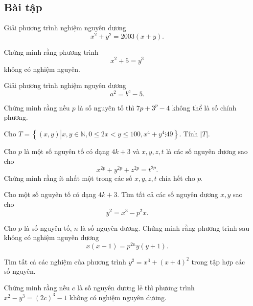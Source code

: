 \subsection{Bài tập}
\setcounter{bt}{0}
\begin{bt}%
	Giải phương trình nghiệm nguyên dương
	$$x^2+y^2=2003(x+y).$$
\end{bt}
\begin{bt}%
	Chứng minh rằng phương trình 
	$$x^2+5=y^3$$
	không có nghiệm nguyên.
\end{bt}
\begin{bt}%
	Giải phương trình nghiệm nguyên dương
	$$a^2=b^c-5.$$
\end{bt}
\begin{bt}%
	Chứng minh rằng nếu $p$ là số nguyên tố thì $7p+3^p-4$ không thể là số chính phương.
\end{bt}
\begin{bt}%
	Cho $T = \left\{ {\left( {x,y} \right)\left| {x,y \in \mathbb{N},0 \le 2x < y \le 100,{x^4} + {y^4} \vdots 49} \right.} \right\}$. Tính $|T|$.
\end{bt}
\begin{bt}%
	Cho $p$ là một số nguyên tố có dạng $4k+3$ và $x,y,z,t$ là các số nguyên dương sao cho $$x^{2p}+y^{2p}+z^{2p}=t^{2p}.$$
	Chứng minh rằng ít nhất một trong các số $x,y,z,t$ chia hết cho $p$.
\end{bt}
\begin{bt}%
	Cho một số nguyên tố có dạng $4k+3$. Tìm tất cả các số nguyên dương $x,y$ sao cho
	$$y^2=x^3-p^2x.$$
\end{bt}
\begin{bt}%
	Cho $p$ là số nguyên tố, $n$ là số nguyên dương. Chứng minh rằng phương trình sau không có nghiệm nguyên dương
	$$x(x+1)=p^{2n}y(y+1).$$
\end{bt}
\begin{bt}%
	Tìm tất cả các nghiệm của phương trình $y^2=x^3+(x+4)^2$ trong tập hợp các số nguyên.
\end{bt}
\begin{bt}%
	Chứng minh rằng nếu $c$ là số nguyên dương lẻ thì phương trình $x^2-y^3=(2c)
	^3-1$ không có nghiệm nguyên dương.
\end{bt}
